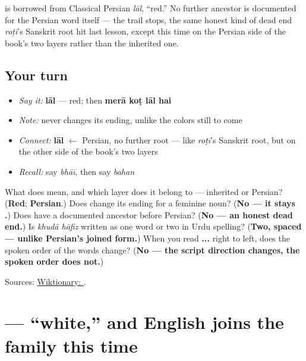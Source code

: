 \begin{cousinweb}
\textbf{} is borrowed from Classical Persian \emph{lāl}, \textquotedblleft{}red.\textquotedblright{} No further ancestor is documented for the Persian word itself — the trail stops, the same honest kind of dead end \emph{roṭī}'s Sanskrit root hit last lesson, except this time on the Persian side of the book's two layers rather than the inherited one.
\end{cousinweb}

\subsection*{Your turn}
\begin{itemize}
\raggedright
  \item \emph{Say it:} \textbf{lāl} — red; then \textbf{merā koṭ lāl hai}
  \item \emph{Note:} \textbf{} never changes its ending, unlike the colors still to come
  \item \emph{Connect:} \textbf{lāl} $\leftarrow$ Persian, no further root — like \emph{roṭī}'s Sanskrit root, but on the other side of the book's two layers
  \item \emph{Recall:} say \emph{bhāī}, then say \emph{bahan}
\end{itemize}

\begin{tcolorbox}[breakable,colback=teal!4,colframe=teal!35!black,title={Before you move on}]
What does \textbf{} mean, and which layer does it belong to — inherited or Persian? (\textbf{Red}; \textbf{Persian}.) Does \textbf{} change its ending for a feminine noun? (\textbf{No — it stays .}) Does \textbf{} have a documented ancestor before Persian? (\textbf{No — an honest dead end.}) Is \emph{khudā hāfiz} written as one word or two in Urdu spelling? (\textbf{Two, spaced — unlike Persian's joined form.}) When you read \textbf{  ... } right to left, does the spoken order of the words change? (\textbf{No — the script direction changes, the spoken order does not.})

Sources: \href{https://en.wiktionary.org/wiki/\%D9\%84\%D8\%A7\%D9\%84}{Wiktionary: }.
\end{tcolorbox}
\section[\texorpdfstring{\ur{سفید} (safed)}{سفید (safed)}]{ — \textquotedblleft{}white,\textquotedblright{} and English joins the family this time}

